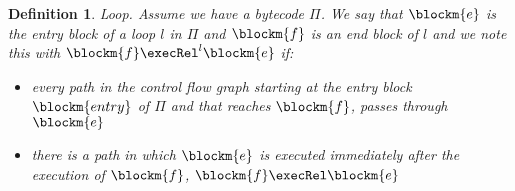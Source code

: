 

\newtheorem{defin}{Definition}
\begin{defin}
{Loop.}
\label{defLoop}
Assume we have a bytecode $\Pi$. We say that $\blockm{e}$ is the entry block of a loop $l$ in $\Pi$ and $\blockm{f}$ is an end block of $l$ and we note this with  
 $\blockm{f} \execRel^l \blockm{e}$ if:
\begin{itemize}
\item every path in the control flow graph starting at the entry block $\blockm{entry}$ of $\Pi$ and that reaches $\blockm{f}$, passes through  $\blockm{e}$ 
\item   there is a path in which $\blockm{e}$  is executed immediately after the execution of $\blockm{f}$,  $\blockm{f} \execRel \blockm{e}$

\end{itemize}
\end{defin}


